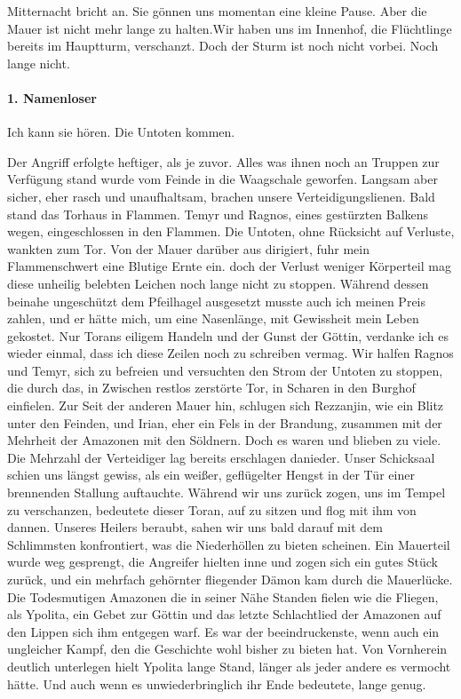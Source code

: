 Mitternacht bricht an. Sie gönnen uns momentan eine kleine Pause. Aber die Mauer ist nicht mehr lange zu halten.Wir haben uns im Innenhof, die Flüchtlinge bereits im Hauptturm, verschanzt.
Doch der Sturm ist noch nicht vorbei. Noch lange nicht.

\paragraph{1. Namenloser}
Ich kann sie hören. Die Untoten kommen.

Der Angriff erfolgte heftiger, als je zuvor. Alles was ihnen noch an Truppen zur Verfügung stand wurde vom Feinde in die Waagschale geworfen. Langsam aber sicher, eher rasch und unaufhaltsam, brachen unsere Verteidigungslienen. Bald stand das Torhaus in Flammen. Temyr und Ragnos, eines gestürzten Balkens wegen, eingeschlossen in den Flammen. Die Untoten, ohne Rücksicht auf Verluste, wankten zum Tor. Von der Mauer darüber aus dirigiert, fuhr mein Flammenschwert eine Blutige Ernte ein. doch der Verlust weniger Körperteil mag diese unheilig belebten Leichen noch lange nicht zu stoppen. Während dessen beinahe ungeschützt dem Pfeilhagel ausgesetzt musste auch ich meinen Preis zahlen, und er hätte mich, um eine Nasenlänge, mit Gewissheit mein Leben gekostet. Nur Torans eiligem Handeln und der Gunst der Göttin, verdanke ich es wieder einmal, dass ich diese Zeilen noch zu schreiben vermag. Wir halfen Ragnos und Temyr, sich zu befreien und versuchten den Strom der Untoten zu stoppen, die durch das, in Zwischen restlos zerstörte Tor, in Scharen in den Burghof einfielen. Zur Seit der anderen Mauer hin, schlugen sich Rezzanjin, wie ein Blitz unter den Feinden, und Irian, eher ein Fels in der Brandung, zusammen mit der Mehrheit der Amazonen mit den Söldnern. Doch es waren und blieben zu viele. Die Mehrzahl der Verteidiger lag bereits erschlagen danieder. Unser Schicksaal schien uns längst gewiss, als ein weißer, geflügelter Hengst in der Tür einer brennenden Stallung auftauchte. Während wir uns zurück zogen, uns im Tempel zu verschanzen, bedeutete dieser Toran, auf zu sitzen und flog mit ihm von dannen. Unseres Heilers beraubt, sahen wir uns bald darauf mit dem Schlimmsten konfrontiert, was die Niederhöllen zu bieten scheinen. Ein Mauerteil wurde weg gesprengt, die Angreifer hielten inne und zogen sich ein gutes Stück zurück, und ein mehrfach gehörnter fliegender Dämon kam durch die Mauerlücke. Die Todesmutigen Amazonen die in seiner Nähe Standen fielen wie die Fliegen, als Ypolita, ein Gebet zur Göttin und das letzte Schlachtlied der Amazonen auf den Lippen sich ihm entgegen warf. Es war der beeindruckenste, wenn auch ein ungleicher Kampf, den die Geschichte wohl bisher zu bieten hat. Von Vornherein deutlich unterlegen hielt Ypolita lange Stand, länger als jeder andere es vermocht hätte. Und auch wenn es unwiederbringlich ihr Ende bedeutete, lange genug.

